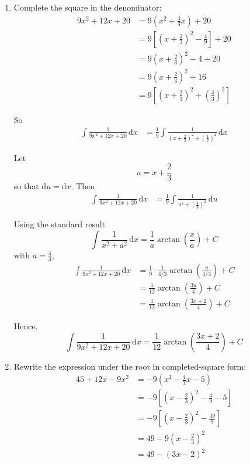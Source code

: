 \documentclass[leqno]{article}
\begin{document}
\begin{enumerate}[
  label=\textbf{\arabic*.},
  leftmargin=*,
  topsep=0pt,
  partopsep=0pt,
  parsep=0pt
]
\begin{tcolorbox}[colback=white, colframe=scarlet, title={\textbf{Solution}}, breakable, grow to left by=6mm, grow to right by=10mm]
\begin{enumerate}[label=\textbf{(\roman*)}]
\item Complete the square in the denominator:
\begin{align*}
9x^2+12x+20
&=9\left(x^2+\frac{4}{3}x\right)+20 \\
&=9\left[\left(x+\frac23\right)^2-\frac49\right]+20 \\
&=9\left(x+\frac23\right)^2-4+20 \\
&=9\left(x+\frac23\right)^2+16 \\
&=9\left[\left(x+\frac23\right)^2+\left(\frac43\right)^2\right]
\end{align*}

So
\begin{align*}
\int \frac{1}{9x^2+12x+20}\,\mathrm{d}x
&=\frac19\int \frac{1}{\left(x+\frac23\right)^2+\left(\frac43\right)^2}\,\mathrm{d}x
\end{align*}

Let
\[
u=x+\frac23
\]
so that $\mathrm{d}u=\mathrm{d}x$. Then
\begin{align*}
\int \frac{1}{9x^2+12x+20}\,\mathrm{d}x
&=\frac19\int \frac{1}{u^2+\left(\frac43\right)^2}\,\mathrm{d}u
\end{align*}

Using the standard result
\[
\int \frac{1}{x^2+a^2}\,\mathrm{d}x=\frac{1}{a}\arctan\!\left(\frac{x}{a}\right)+C
\]
with $a=\frac43$,
\begin{align*}
\int \frac{1}{9x^2+12x+20}\,\mathrm{d}x
&=\frac19 \cdot \frac{1}{4/3}\arctan\!\left(\frac{u}{4/3}\right)+C \\
&=\frac{1}{12}\arctan\!\left(\frac{3u}{4}\right)+C \\
&=\frac{1}{12}\arctan\!\left(\frac{3x+2}{4}\right)+C
\end{align*}

Hence,
\[
\int \frac{1}{9x^2 + 12x + 20}\,\mathrm{d}x=\frac{1}{12}\arctan\!\left(\frac{3x+2}{4}\right)+C
\]

\item Rewrite the expression under the root in completed-square form:
\begin{align*}
45+12x-9x^2
&=-9\left(x^2-\frac43x-5\right) \\
&=-9\left[\left(x-\frac23\right)^2-\frac49-5\right] \\
&=-9\left[\left(x-\frac23\right)^2-\frac{49}{9}\right] \\
&=49-9\left(x-\frac23\right)^2 \\
&=49-(3x-2)^2
\end{align*}


\end{enumerate}
\end{tcolorbox}
\end{enumerate}
\end{document}
